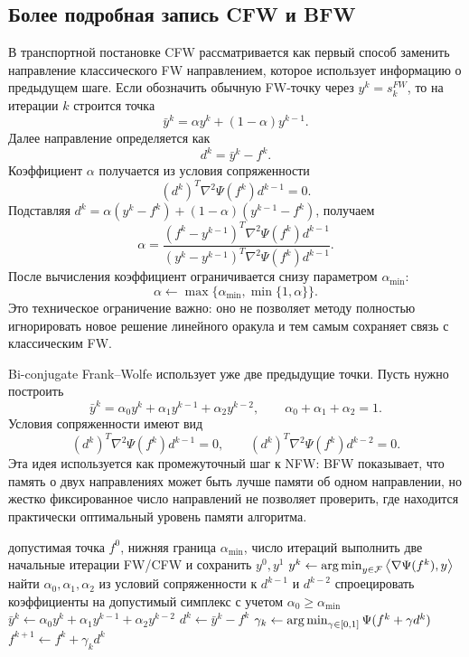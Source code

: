 \subsection{Более подробная запись CFW и BFW}

В транспортной постановке CFW рассматривается как первый способ заменить направление
классического FW направлением, которое использует информацию о предыдущем шаге.
Если обозначить обычную FW-точку через $y^k=s_k^{FW}$, то на итерации $k$ строится точка
\[
    \bar y^k=\alpha y^k+(1-\alpha)y^{k-1}.
\]
Далее направление определяется как
\[
    d^k=\bar y^k-f^k.
\]
Коэффициент $\alpha$ получается из условия сопряженности
\[
    (d^k)^T\nabla^2\Psi(f^k)d^{k-1}=0.
\]
Подставляя $d^k=\alpha(y^k-f^k)+(1-\alpha)(y^{k-1}-f^k)$, получаем
\[
    \alpha
    =
    \frac{(f^k-y^{k-1})^T\nabla^2\Psi(f^k)d^{k-1}}
    {(y^k-y^{k-1})^T\nabla^2\Psi(f^k)d^{k-1}}.
\]
После вычисления коэффициент ограничивается снизу параметром $\alpha_{\min}$:
\[
    \alpha\leftarrow \max\{\alpha_{\min},\min\{1,\alpha\}\}.
\]
Это техническое ограничение важно: оно не позволяет методу полностью игнорировать новое решение
линейного оракула и тем самым сохраняет связь с классическим FW.

Bi-conjugate Frank--Wolfe использует уже две предыдущие точки.
Пусть нужно построить
\[
    \bar y^k=\alpha_0y^k+\alpha_1y^{k-1}+\alpha_2y^{k-2},
    \qquad
    \alpha_0+\alpha_1+\alpha_2=1.
\]
Условия сопряженности имеют вид
\[
    (d^k)^T\nabla^2\Psi(f^k)d^{k-1}=0,
    \qquad
    (d^k)^T\nabla^2\Psi(f^k)d^{k-2}=0.
\]
Эта идея используется как промежуточный шаг к NFW: BFW показывает,
что память о двух направлениях может быть лучше памяти об одном направлении,
но жестко фиксированное число направлений не позволяет проверить, где находится
практически оптимальный уровень памяти алгоритма.

\begin{algorithm}
\caption{Bi-conjugate Frank--Wolfe}
\begin{algorithmic}
\REQUIRE допустимая точка $f^0$, нижняя граница $\alpha_{\min}$, число итераций
\STATE выполнить две начальные итерации FW/CFW и сохранить $y^0,y^1$
\STATE $y^k\gets\operatorname*{arg\,min}_{y\in\mathcal{F}}\left\langle \nabla\Psi(f^k), y \right\rangle$
\STATE найти $\alpha_0,\alpha_1,\alpha_2$ из условий сопряженности к $d^{k-1}$ и $d^{k-2}$
\STATE спроецировать коэффициенты на допустимый симплекс с учетом $\alpha_0\geq\alpha_{\min}$
\STATE $\bar y^k\gets\alpha_0y^k+\alpha_1y^{k-1}+\alpha_2y^{k-2}$
\STATE $d^k\gets\bar y^k-f^k$
\STATE $\gamma_k\gets\operatorname*{arg\,min}_{\gamma\in[0,1]}\Psi(f^k+\gamma d^k)$
\STATE $f^{k+1}\gets f^k+\gamma_kd^k$
\ENDFOR
\end{algorithmic}
\end{algorithm}

